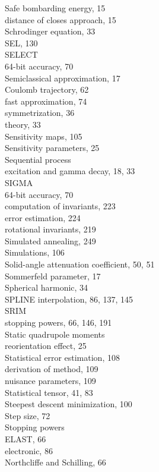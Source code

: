 \documentclass[10pt]{article}
\begin{document}
Safe bombarding energy, 15\\
distance of closes approach, 15\\
Schrodinger equation, 33\\
SEL, 130\\
SELECT\\
64-bit accuracy, 70\\
Semiclassical approximation, 17\\
Coulomb trajectory, 62\\
fast approximation, 74\\
symmetrization, 36\\
theory, 33\\
Sensitivity maps, 105\\
Sensitivity parameters, 25\\
Sequential process\\
excitation and gamma decay, 18, 33\\
SIGMA\\
64-bit accuracy, 70\\
computation of invariants, 223\\
error estimation, 224\\
rotational invariants, 219\\
Simulated annealing, 249\\
Simulations, 106\\
Solid-angle attenuation coefficient, 50, 51\\
Sommerfeld parameter, 17\\
Spherical harmonic, 34\\
SPLINE interpolation, 86, 137, 145\\
SRIM\\
stopping powers, 66, 146, 191\\
Static quadrupole moments\\
reorientation effect, 25\\
Statistical error estimation, 108\\
derivation of method, 109\\
nuisance parameters, 109\\
Statistical tensor, 41, 83\\
Steepest descent minimization, 100\\
Step size, 72\\
Stopping powers\\
ELAST, 66\\
electronic, 86\\
Northcliffe and Schilling, 66\\
\end{document}

